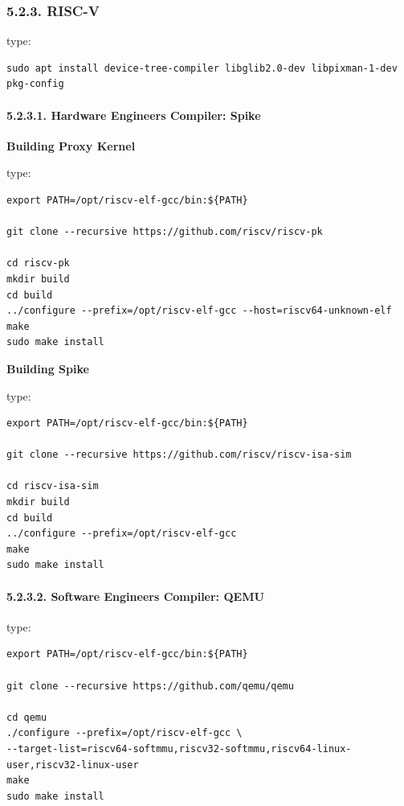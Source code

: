 \documentclass[
]{article}
\begin{document}
\hypertarget{risc-v-2}{%
\subsubsection{5.2.3. RISC-V}\label{risc-v-2}}

type:

\begin{verbatim}
sudo apt install device-tree-compiler libglib2.0-dev libpixman-1-dev pkg-config
\end{verbatim}

\hypertarget{hardware-engineers-compiler-spike}{%
\paragraph{5.2.3.1. Hardware Engineers Compiler:
Spike}\label{hardware-engineers-compiler-spike}}

\textbf{Building Proxy Kernel}

type:

\begin{verbatim}
export PATH=/opt/riscv-elf-gcc/bin:${PATH}

git clone --recursive https://github.com/riscv/riscv-pk

cd riscv-pk
mkdir build
cd build
../configure --prefix=/opt/riscv-elf-gcc --host=riscv64-unknown-elf
make
sudo make install
\end{verbatim}

\textbf{Building Spike}

type:

\begin{verbatim}
export PATH=/opt/riscv-elf-gcc/bin:${PATH}

git clone --recursive https://github.com/riscv/riscv-isa-sim

cd riscv-isa-sim
mkdir build
cd build
../configure --prefix=/opt/riscv-elf-gcc
make
sudo make install
\end{verbatim}

\hypertarget{software-engineers-compiler-qemu}{%
\paragraph{5.2.3.2. Software Engineers Compiler:
QEMU}\label{software-engineers-compiler-qemu}}

type:

\begin{verbatim}
export PATH=/opt/riscv-elf-gcc/bin:${PATH}

git clone --recursive https://github.com/qemu/qemu

cd qemu
./configure --prefix=/opt/riscv-elf-gcc \
--target-list=riscv64-softmmu,riscv32-softmmu,riscv64-linux-user,riscv32-linux-user
make
sudo make install
\end{verbatim}
\end{document}
